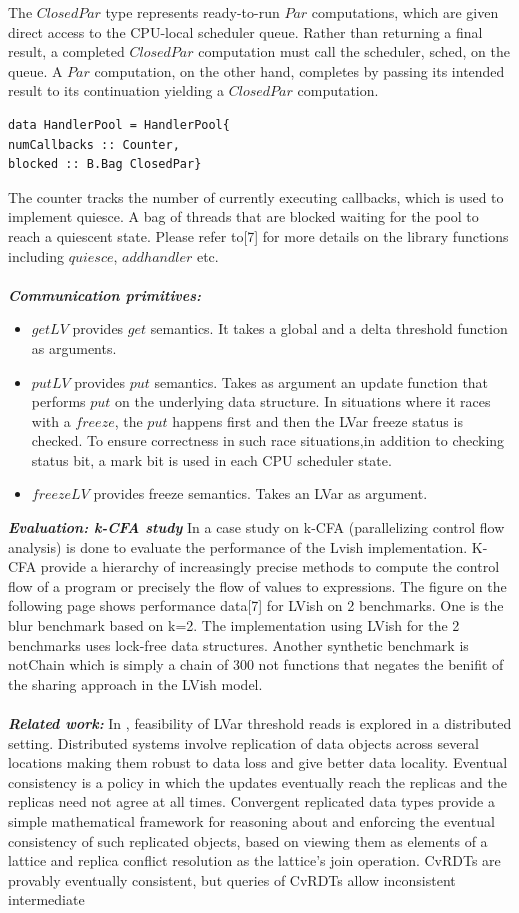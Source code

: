 \documentclass[twocolumn]{article}
\begin{document}
The $ClosedPar$ type represents ready-to-run $Par$ computations, which are given direct access to the CPU-local scheduler queue. Rather than returning a final result, a completed $ClosedPar$ computation must call the scheduler, sched, on the queue. A $Par$
computation, on the other hand, completes by passing its intended result to its continuation yielding a $ClosedPar$ computation.
\begin{lstlisting}
data HandlerPool = HandlerPool{
numCallbacks :: Counter,
blocked :: B.Bag ClosedPar}
\end{lstlisting}
The counter tracks the number of currently executing callbacks, which is used to implement quiesce. A bag of threads that are blocked waiting for the pool to reach a quiescent state. Please refer to[7] for more details on the library functions
including $quiesce$, $addhandler$ etc.\\ \\
\textbf{\textit{Communication primitives:}}
\begin{itemize}
\item $getLV$ provides $get$ semantics. It takes a global and a delta threshold function as arguments.
\item $putLV$ provides $put$ semantics. Takes as argument an update function that performs $put$ on the underlying data structure. In situations where it races with a $freeze$, the $put$ happens first and then the LVar freeze status is checked.
To ensure correctness in such race situations,in addition to checking status bit, a mark bit is used in each CPU scheduler state.
\item $freezeLV$ provides freeze semantics. Takes an LVar as argument.
\end{itemize}
\textbf{\textit{Evaluation: k-CFA study}} In \cite{lkuper2} a case study on k-CFA (parallelizing control flow analysis) is done to evaluate the performance of the Lvish implementation. K-CFA provide a hierarchy of increasingly precise methods to compute the control 
flow of a program or precisely the flow of values to expressions. The figure on the following page shows performance data[7] for LVish on 2 benchmarks. One is the blur benchmark based on k=2. The implementation using LVish for the 2 benchmarks uses lock-free data structures. Another synthetic benchmark is notChain which is simply a chain of 300 not functions that negates the benifit of the sharing approach in the LVish model.\\ \\
\textbf{\textit{Related work:}} In \cite{newton2}, feasibility of LVar threshold reads is explored in a distributed setting. Distributed systems involve replication of data objects across several locations making them robust to data loss and give better data locality. Eventual consistency is a policy in which the updates eventually reach the replicas and the replicas need not agree at all times. Convergent replicated data types provide a simple mathematical framework for reasoning about and enforcing the eventual consistency of such replicated objects, based on viewing them as elements of a lattice and replica conflict resolution as the lattice's join operation. CvRDTs are provably eventually consistent, but queries of CvRDTs allow inconsistent intermediate
\end{document}
